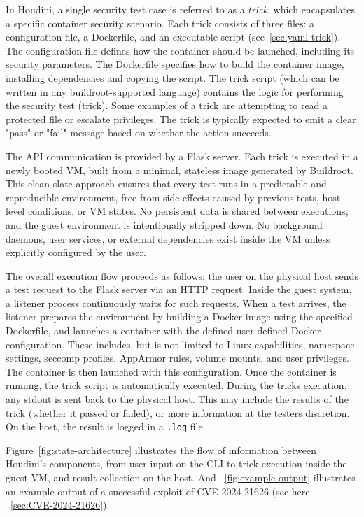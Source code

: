 \documentclass[12pt]{report}
\begin{document}
\begin{doublespace}
In Houdini, a single security test case is referred to as a \textit{trick}, which encapsulates a specific container security scenario. Each trick consists of three files: a configuration file, a Dockerfile, and an executable script (see~\ref{sec:yaml-trick}). The configuration file defines how the container should be launched, including its security parameters. The Dockerfile specifies how to build the container image, installing dependencies and copying the script. The trick script (which can be written in any buildroot-supported language) contains the logic for performing the security test (trick). Some examples of a trick are attempting to read a protected file or escalate privileges. The trick is typically expected to emit a clear "pass" or "fail" message based on whether the action succeeds.

The API communication is provided by a Flask server. Each trick is executed in a newly booted VM, built from a minimal, stateless image generated by Buildroot. This clean-slate approach ensures that every test runs in a predictable and reproducible environment, free from side effects caused by previous tests, host-level conditions, or VM states. No persistent data is shared between executions, and the guest environment is intentionally stripped down. No background daemons, user services, or external dependencies exist inside the VM unless explicitly configured by the user.

The overall execution flow proceeds as follows: the user on the physical host sends a test request to the Flask server via an HTTP request. Inside the guest system, a listener process continuously waits for such requests. When a test arrives, the listener prepares the environment by building a Docker image using the specified Dockerfile, and launches a container with the defined user-defined Docker configuration. These includes, but is not limited to Linux capabilities, namespace settings, seccomp profiles, AppArmor rules, volume mounts, and user privileges. The container is then launched with this configuration. Once the container is running, the trick script is automatically executed. During the tricks execution, any stdout is sent back to the physical host. This may include the results of the trick (whether it passed or failed), or more information at the testers discretion. On the host, the result is logged in a \texttt{.log} file.

Figure~\ref{fig:state-architecture} illustrates the flow of information between Houdini's components, from user input on the CLI to trick execution inside the guest VM, and result collection on the host. And ~\ref{fig:example-output} illustrates an example output of a successful exploit of CVE-2024-21626 (see here ~\ref{sec:CVE-2024-21626}).



\end{doublespace}
\end{document}
